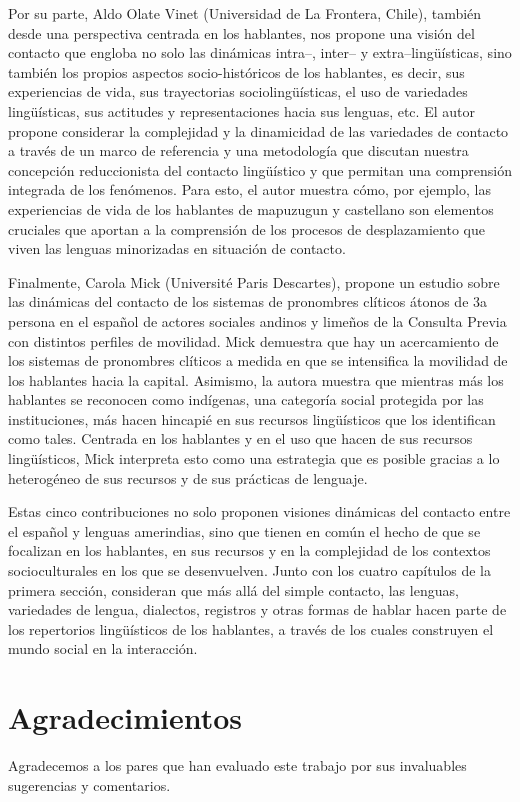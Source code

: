 \documentclass[output=paper]{langscibook}
\begin{document}
Por su parte, Aldo Olate Vinet (Universidad de La Frontera, Chile), también desde una perspectiva centrada en los hablantes, nos propone una visión del contacto que engloba no solo las dinámicas intra--, inter-- y extra--lingüísticas, sino también los propios aspectos socio-históricos de los hablantes, es decir, sus experiencias de vida, sus trayectorias sociolingüísticas, el uso de variedades lingüísticas, sus actitudes y representaciones hacia sus lenguas, etc. El autor propone considerar la complejidad y la dinamicidad de las variedades de contacto a través de un marco de referencia y una metodología que discutan nuestra concepción reduccionista del contacto lingüístico y que permitan una comprensión integrada de los fenómenos. Para esto, el autor muestra cómo, por ejemplo, las experiencias de vida de los hablantes de mapuzugun y castellano son elementos cruciales que aportan a la comprensión de los procesos de desplazamiento que viven las lenguas minorizadas en situación de contacto.

Finalmente, Carola Mick (Université Paris Descartes), propone un estudio sobre las dinámicas del contacto de los sistemas de pronombres clíticos átonos de 3a persona en el español de actores sociales andinos y limeños de la Consulta Previa con distintos perfiles de movilidad. Mick demuestra que hay un acercamiento de los sistemas de pronombres clíticos a medida en que se intensifica la movilidad de los hablantes hacia la capital. Asimismo, la autora muestra que mientras más los hablantes se reconocen como indígenas, una categoría social protegida por las instituciones, más hacen hincapié en sus recursos lingüísticos que los identifican como tales. Centrada en los hablantes y en el uso que hacen de sus recursos lingüísticos, Mick interpreta esto como una estrategia que es posible gracias a lo heterogéneo de sus recursos y de sus prácticas de lenguaje.  

Estas cinco contribuciones no solo proponen visiones dinámicas del contacto entre el español y lenguas amerindias, sino que tienen en común el hecho de que se focalizan en los hablantes, en sus recursos y en la complejidad de los contextos socioculturales en los que se desenvuelven. Junto con los cuatro capítulos de la primera sección, consideran que más allá del simple contacto, las lenguas, variedades de lengua, dialectos, registros y otras formas de hablar hacen parte de los repertorios lingüísticos de los hablantes, a través de los cuales construyen el mundo social en la interacción.  

\section*{Agradecimientos}

Agradecemos a los pares que han evaluado este trabajo por sus invaluables sugerencias y comentarios.

\sloppy\printbibliography[heading=subbibliography,notkeyword=this]
\end{document}
